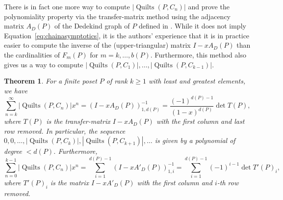 \documentclass[12pt]{amsart}
\numberwithin{equation}{section}
\newtheorem{theorem}{Theorem}[section]
\theoremstyle{definition}
\newcommand{\quilt}{\operatorname{Quilts}}
\begin{document}
There is in fact one more way to compute $|\quilt(P,C_n)|$ and prove
the polynomiality property via the  transfer-matrix method
\cite[Thm. 4.7.2]{ec1}  using the adjacency matrix $A_D(P)$ of the
Dedekind graph of $P$ defined in . While it
does not imply Equation~\eqref{eq:chainasymptotics}, it is the
authors' experience that it is in practice easier to compute the
inverse of the (upper-triangular) matrix $I - x A_D(P)$ than the
cardinalities of $F_m(P)$ for $m = k,\ldots,b(P)$. Furthermore, this
method also gives us a way to compute $|\quilt(P, C_1)|,\ldots,
|\quilt(P, C_{k-1})|$.


\begin{theorem} \label{thm:graph}
 For a finite poset $P$ of rank $k\geq 1$ with least and greatest elements,  we have
\begin{equation}\label{eq:transfer.1}
\sum_{n=k}^\infty |\quilt(P, C_n)|  x^n = (I - x
 A_D(P))^{-1}_{1,d(P)} = \frac{(-1)^{d(P)-1}}{(1-x)^{d(P)}} \det T(P),
\end{equation}
 where $T(P)$ is the transfer-matrix $I - x A_D(P)$ with the first column
 and last row removed. In particular, the sequence
 $0,0,\ldots,|\quilt(P, C_k)|, |\quilt(P, C_{k+1})|,\ldots$ is given
 by a polynomial of degree $< d(P)$. 
 Furthermore,
\begin{equation}\label{eq:transfer.2}
\sum_{n=0}^{k-1} |\quilt(P, C_n)| x^n = \sum_{i=1}^{d(P)-1} (I - x A'_D(P))^{-1}_{1,i} =  \sum_{i=1}^{d(P)-1} (-1)^{i-1} \det T'(P)_i,
\end{equation}
  where $T'(P)_i$ is the matrix $I - x A'_D(P)$ with the first column and $i$-th row removed.
\end{theorem}
\end{document}
